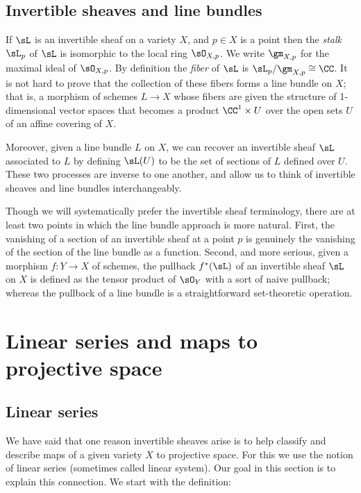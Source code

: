 \subsection{Invertible sheaves and line bundles}

If $\sL$ is an invertible sheaf on a variety $X$, and $p\in X$ is a point then the \emph{stalk} $\sL_p$ of $\sL$ is isomorphic to the local
ring $\sO_{X,p}$. We write $\gm_{X,p}$ for the maximal ideal of $\sO_{X,p}$. By definition the \emph{fiber} of $\sL$ is 
$\sL_p/\gm_{X,p}\cong \CC$. It is not hard to prove that the collection of these fibers forms a line bundle on $X$; that is,
a morphism of schemes $L \to X$ whose fibers are given the structure of 1-dimensional vector spaces that becomes
a product $\CC^1 \times U$ over the open sets $U$ of an affine covering of $X$.

Moreover,
given a line bundle $L$ on $X$, we can recover an invertible sheaf $\sL$ associated to $L$ by defining
$\sL(U)$ to be the set of sections of $L$ defined over $U$. These two processes are inverse to one another, and allow
us to think of invertible sheaves and line bundles interchangeably.

Though we will systematically prefer the invertible sheaf terminology, there are at least two points in which the line bundle approach is more natural. First,  the vanishing of a section of an invertible sheaf at a point $p$ is genuinely the vanishing of the 
section of the line bundle as a function. Second, and more serious, given a morphism $f: Y\to X$ of schemes, the 
pullback $f^*(\sL)$ of an invertible sheaf $\sL$ on $X$ is defined as the tensor product of $\sO_Y$ with a sort of naive pullback; whereas the pullback of a line bundle is a straightforward set-theoretic operation.

\section{Linear series and maps to projective space}

\subsection{Linear series}

We have said that one reason invertible sheaves arise is to help classify and describe maps of a given variety $X$ to projective space. For this we use the notion of linear series (sometimes called linear system). Our goal in this section is to explain this connection. We start with the definition:

